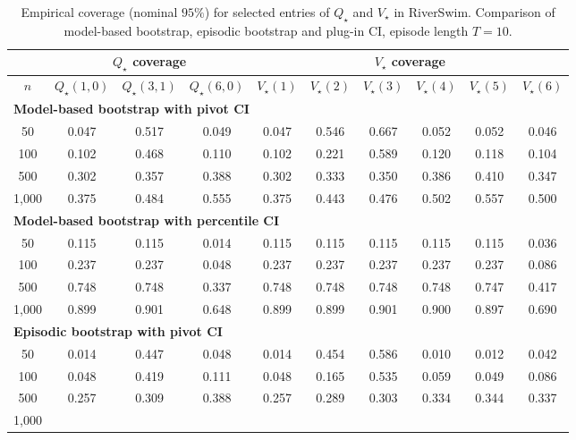 \documentclass{article}
\numberwithin{equation}{section}
\begin{document}
\begin{table}[ht]
\centering
\caption{Empirical coverage (nominal $95\%$) for selected entries of $Q_\star$ and $V_\star$ in RiverSwim. Comparison of model-based bootstrap, episodic bootstrap and plug-in CI, episode length $T=10$.}
\label{tab:riverswim-optimal-coverage-T10}
\begin{tabular}{c|ccc|cccccc}
\hline
& \multicolumn{3}{c|}{$Q_\star$ coverage} & \multicolumn{6}{c}{$V_\star$ coverage} \\ \hline
$n$
& $Q_\star(1,0)$ & $Q_\star(3,1)$ & $Q_\star(6,0)$
& $V_\star(1)$ & $V_\star(2)$ & $V_\star(3)$ & $V_\star(4)$ & $V_\star(5)$ & $V_\star(6)$ \\
\hline
\multicolumn{10}{l}{\textbf{Model-based bootstrap with pivot CI}} \\ \hline
50
& 0.047 & 0.517 & 0.049
& 0.047 & 0.546 & 0.667 & 0.052 & 0.052 & 0.046 \\
100
& 0.102 & 0.468 & 0.110
& 0.102 & 0.221 & 0.589 & 0.120 & 0.118 & 0.104 \\
500
& 0.302 & 0.357 & 0.388
& 0.302 & 0.333 & 0.350 & 0.386 & 0.410 & 0.347 \\
1{,}000
& 0.375 & 0.484 & 0.555
& 0.375 & 0.443 & 0.476 & 0.502 & 0.557 & 0.500 \\
\hline
\multicolumn{10}{l}{\textbf{Model-based bootstrap with percentile CI}} \\ \hline
50
& 0.115 & 0.115 & 0.014
& 0.115 & 0.115 & 0.115 & 0.115 & 0.115 & 0.036 \\
100
& 0.237 & 0.237 & 0.048
& 0.237 & 0.237 & 0.237 & 0.237 & 0.237 & 0.086 \\
500
& 0.748 & 0.748 & 0.337
& 0.748 & 0.748 & 0.748 & 0.748 & 0.747 & 0.417 \\
1{,}000
& \cellcolor{covheat!75!white}0.899 & \cellcolor{covheat!76!white}0.901 & 0.648
& \cellcolor{covheat!75!white}0.899 & \cellcolor{covheat!75!white}0.899 & \cellcolor{covheat!76!white}0.901 & \cellcolor{covheat!75!white}0.900 & \cellcolor{covheat!74!white}0.897 & 0.690 \\
\hline
\multicolumn{10}{l}{\textbf{Episodic bootstrap with pivot CI}} \\ \hline
50
& 0.014 & 0.447 & 0.048
& 0.014 & 0.454 & 0.586 & 0.010 & 0.012 & 0.042 \\
100
& 0.048 & 0.419 & 0.111
& 0.048 & 0.165 & 0.535 & 0.059 & 0.049 & 0.086 \\
500
& 0.257 & 0.309 & 0.388
& 0.257 & 0.289 & 0.303 & 0.334 & 0.344 & 0.337 \\
1{,}000

\end{tabular}
\end{table}
\end{document}

